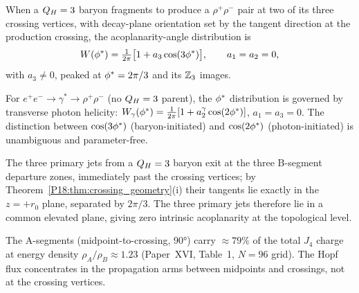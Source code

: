 \begin{theorem}
\label{P18:thm:phi_star}
When a $Q_H=3$ baryon fragments to produce a $\rho^+\rho^-$ pair at
two of its three crossing vertices, with decay-plane orientation set
by the tangent direction at the production crossing, the
acoplanarity-angle distribution is
\begin{equation}
  W(\phi^*) = \tfrac{1}{2\pi}\bigl[1+a_3\cos(3\phi^*)\bigr],
  \qquad a_1=a_2=0,
\end{equation}
with $a_3\neq0$, peaked at $\phi^*=2\pi/3$ and its $\mathbb{Z}_3$
images.
\end{theorem}

\begin{remark}
\label{P18:rem:photon_contrast}
For $e^+e^-\to\gamma^*\to\rho^+\rho^-$ (no $Q_H=3$ parent), the
$\phi^*$ distribution is governed by transverse photon helicity:
$W_\gamma(\phi^*)=\tfrac{1}{2\pi}[1+a_2^\gamma\cos(2\phi^*)]$,
$a_1=a_3=0$. The distinction between $\cos(3\phi^*)$
(baryon-initiated) and $\cos(2\phi^*)$ (photon-initiated) is
unambiguous and parameter-free.
\end{remark}

\begin{proposition}
\label{P18:prop:coplanarity}
The three primary jets from a $Q_H=3$ baryon exit at the three
B-segment departure zones, immediately past the crossing vertices;
by Theorem~\ref{P18:thm:crossing_geometry}(i) their tangents lie exactly
in the $z=+r_0$ plane, separated by $2\pi/3$. The three primary jets
therefore lie in a common elevated plane, giving zero intrinsic
acoplanarity at the topological level.
\end{proposition}

\begin{proposition}
\label{P18:prop:arcseg_dominance}
The A-segments (midpoint-to-crossing, 90°) carry $\approx79\%$ of
the total $J_4$ charge at energy density $\rho_A/\rho_B\approx1.23$
(Paper~XVI, Table~1, $N=96$ grid). The Hopf flux concentrates in the
propagation arms between midpoints and crossings, not at the
crossing vertices.
\end{proposition}

